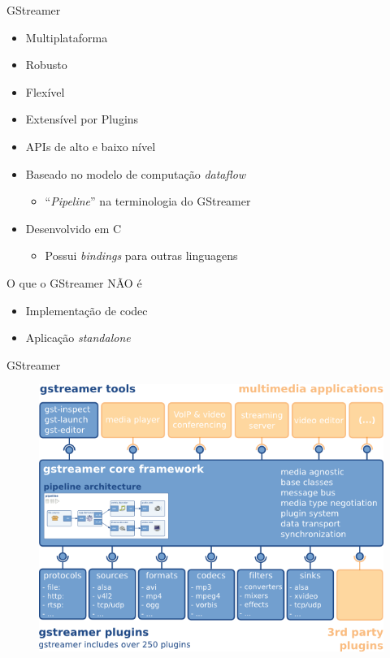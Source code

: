 \documentclass{beamer}
\def\en#1{\foreignlanguage{english}{\emph{#1}}}
\begin{document}
\begin{frame}[c]{GStreamer}
  \begin{itemize}
    \item Multiplataforma
    \item Robusto
    \item Flexível
    \item Extensível por Plugins
    \item APIs de alto e baixo nível
    \item Baseado no modelo de computação \en{dataflow}
      \begin{itemize}
        \item ``\en{Pipeline}'' na terminologia do GStreamer
      \end{itemize}
    \item Desenvolvido em C
      \begin{itemize}
        \item Possui \en{bindings} para outras linguagens
      \end{itemize}
  \end{itemize}

  \begin{block}{O que o GStreamer NÃO é}
    \begin{itemize}
      \item Implementação de codec
      \item Aplicação \en{standalone}
    \end{itemize}
  \end{block}
\end{frame}

\begin{frame}[c]{GStreamer}
  \begin{figure}
    \centering
    \includegraphics[scale=0.5]{figs/gstreamer-overview}
  \end{figure}
\end{frame}
\end{document}
